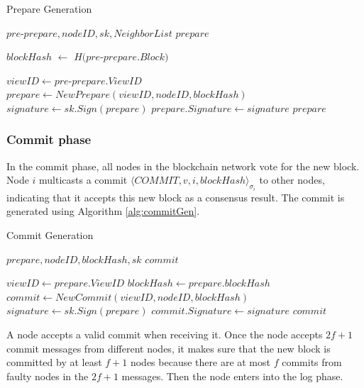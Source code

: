  \begin{algorithm}
 \caption{Prepare Generation}
   \begin{algorithmic}[H]\label{alg:prepareGen}
   \renewcommand{\algorithmicrequire}{\textbf{Input:}}
   \renewcommand{\algorithmicensure}{\textbf{Output:}}
   \REQUIRE $pre$-$prepare, nodeID, sk, NeighborList$
   \ENSURE  $prepare$

    \STATE $blockHash$ $\gets$ $H(pre$-$prepare.Block)$

    \STATE $viewID \gets pre$-$prepare.ViewID$
    \STATE $prepare \gets NewPrepare(viewID, nodeID, blockHash)$
    \STATE $signature \gets sk.Sign(prepare)$
    \STATE $prepare.Signature \gets signature$
   \RETURN $prepare$
   \end{algorithmic}
 \end{algorithm}

\subsubsection{Commit phase}

In the commit phase, all nodes in the blockchain network vote for the new block. Node $i$ multicasts a commit $\langle COMMIT, v, i, blockHash \rangle_{\sigma_{i}}$ to other nodes, indicating that it accepts this new block as a consensus result. The commit is generated using Algorithm \ref{alg:commitGen}.

 \begin{algorithm}
 \caption{Commit Generation}
   \begin{algorithmic}[H]\label{alg:commitGen}
   \renewcommand{\algorithmicrequire}{\textbf{Input:}}
   \renewcommand{\algorithmicensure}{\textbf{Output:}}
   \REQUIRE $prepare, nodeID, blockHash, sk$
   \ENSURE  $commit$

    \STATE $viewID \gets prepare.ViewID$
    \STATE $blockHash \gets prepare.blockHash$
    \STATE $commit \gets NewCommit(viewID, nodeID, blockHash)$
    \STATE $signature \gets sk.Sign(prepare)$
    \STATE $commit.Signature \gets signature$
   \RETURN $commit$
   \end{algorithmic}
 \end{algorithm}

A node accepts a valid commit when receiving it. Once the node accepts $2f+1$ commit messages from different nodes, it makes sure that the new block is committed by at least $f+1$ nodes because there are at most $f$ commits from faulty nodes in the $2f+1$ messages. Then the node enters into the log phase.

